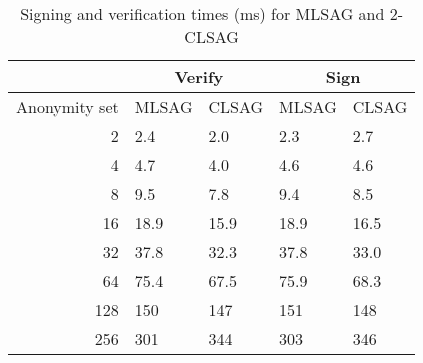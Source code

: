 \documentclass{llncs}
\begin{document}
\begin{table}[htp]
\begin{center}
\begin{tabular}{r|ll|ll}
& \multicolumn{2}{c|}{Verify} & \multicolumn{2}{c}{Sign} \\
\hline
Anonymity set & MLSAG & CLSAG & MLSAG & CLSAG \\
\hline
2 & 2.4 & 2.0 & 2.3 & 2.7 \\
4 & 4.7 & 4.0 & 4.6 & 4.6 \\
8 & 9.5 & 7.8 & 9.4 & 8.5 \\
16 & 18.9 & 15.9 & 18.9 & 16.5 \\
32 & 37.8 & 32.3 & 37.8 & 33.0 \\
64 & 75.4 & 67.5 & 75.9 & 68.3 \\
128 & 150 & 147 & 151 & 148 \\
256 & 301 & 344 & 303 & 346
\end{tabular}
\end{center}
\caption{Signing and verification times (ms) for MLSAG and $2$-CLSAG}
\label{table:timing}
\end{table}



\end{document}
